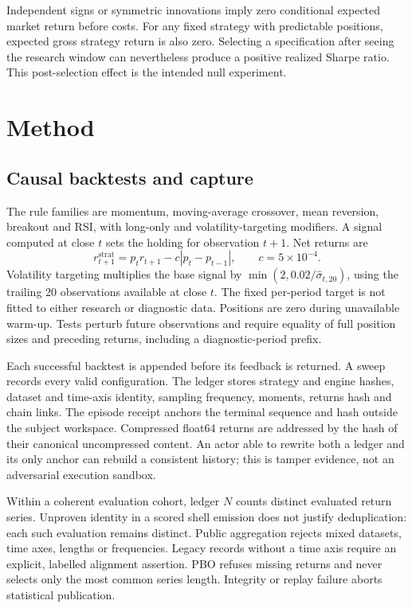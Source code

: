 \documentclass[11pt]{article}
\begin{document}
Independent signs or symmetric innovations imply zero conditional expected
market return before costs. For any fixed strategy with predictable positions,
expected gross strategy return is also zero. Selecting a specification after
seeing the research window can nevertheless produce a positive realized
Sharpe ratio. This post-selection effect is the intended null experiment.

\section{Method}
\subsection{Causal backtests and capture}
The rule families are momentum, moving-average crossover, mean reversion,
breakout and RSI, with long-only and volatility-targeting modifiers. A signal
computed at close $t$ sets the holding for observation $t+1$. Net returns are
\begin{equation}
 r^{\mathrm{strat}}_{t+1}=p_t r_{t+1}-c|p_t-p_{t-1}|,
 \qquad c=5\times10^{-4}.
\end{equation}
Volatility targeting multiplies the base signal by
$\min(2,0.02/\widehat\sigma_{t,20})$, using the trailing 20 observations
available at close $t$. The fixed per-period target is not fitted to either
research or diagnostic data. Positions are zero during unavailable warm-up.
Tests perturb future observations and require equality of full position sizes
and preceding returns, including a diagnostic-period prefix.

Each successful backtest is appended before its feedback is returned. A sweep
records every valid configuration. The ledger stores strategy and engine hashes,
dataset and time-axis identity, sampling frequency, moments, returns hash and
chain links. The episode receipt anchors the terminal sequence and hash outside
the subject workspace. Compressed float64 returns are addressed by the hash of
their canonical uncompressed content. An actor able to rewrite both a ledger
and its only anchor can rebuild a consistent history; this is tamper evidence,
not an adversarial execution sandbox.

Within a coherent evaluation cohort, ledger $N$ counts distinct evaluated return
series. Unproven identity in a scored shell emission does not justify
deduplication: each such evaluation remains distinct. Public aggregation rejects
mixed datasets, time axes, lengths or frequencies. Legacy records without a time
axis require an explicit, labelled alignment assertion. PBO refuses missing
returns and never selects only the most common series length. Integrity or replay
failure aborts statistical publication.
\end{document}

